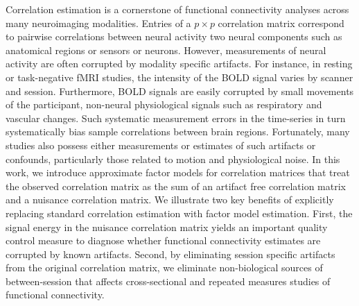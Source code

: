 Correlation estimation is a cornerstone of functional connectivity analyses across many neuroimaging modalities. Entries of a $p \times p$ correlation matrix correspond to pairwise correlations between neural activity two neural components such as anatomical regions or sensors or neurons. However, measurements of neural activity are often corrupted by modality specific artifacts. For instance, in resting or task-negative fMRI studies, the intensity of the BOLD signal varies by scanner and session. Furthermore, BOLD signals are easily corrupted by small movements of the participant, non-neural physiological signals such as respiratory and vascular changes. Such systematic measurement errors in the time-series in turn systematically bias sample correlations between brain regions. Fortunately, many studies also possess either measurements or estimates of such artifacts or confounds, particularly those related to motion and physiological noise. In this work, we introduce approximate factor models for correlation matrices that treat the observed correlation matrix as the sum of an artifact free correlation matrix and a nuisance correlation matrix. We illustrate two key benefits of explicitly replacing standard correlation estimation with factor model estimation. First, the signal energy in the nuisance correlation matrix yields an important quality control measure to diagnose whether functional connectivity estimates are corrupted by known artifacts. Second, by eliminating session specific artifacts from the original correlation matrix, we eliminate non-biological sources of between-session that affects cross-sectional and repeated measures studies of functional connectivity.